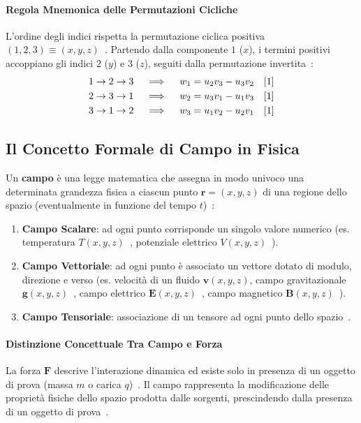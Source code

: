 \documentclass[12pt, a4paper]{article}
\begin{document}
\paragraph{Regola Mnemonica delle Permutazioni Cicliche}
L'ordine degli indici rispetta la permutazione ciclica positiva $(1, 2, 3) \equiv (x, y, z)$~\cite{1}. Partendo dalla componente $1$ ($x$), i termini positivi accoppiano gli indici $2$ ($y$) e $3$ ($z$), seguiti dalla permutazione invertita~\cite{1}:
\begin{align*}
1 \to 2 \to 3 &\quad \implies \quad w_1 = u_2 v_3 - u_3 v_2 \quad \text{\cite{1}} \\
2 \to 3 \to 1 &\quad \implies \quad w_2 = u_3 v_1 - u_1 v_3 \quad \text{\cite{1}} \\
3 \to 1 \to 2 &\quad \implies \quad w_3 = u_1 v_2 - u_2 v_1 \quad \text{\cite{1}}
\end{align*}

\subsection{Il Concetto Formale di Campo in Fisica}

Un \textbf{campo} è una legge matematica che assegna in modo univoco una determinata grandezza fisica a ciascun punto $\mathbf{r} = (x,y,z)$ di una regione dello spazio (eventualmente in funzione del tempo $t$)~\cite{1}:

\begin{enumerate}
    \item \textbf{Campo Scalare}: ad ogni punto corrisponde un singolo valore numerico (es. temperatura $T(x,y,z)$~\cite{1, 3}, potenziale elettrico $V(x,y,z)$~\cite{2}).
    \item \textbf{Campo Vettoriale}: ad ogni punto è associato un vettore dotato di modulo, direzione e verso (es. velocità di un fluido $\mathbf{v}(x,y,z)$, campo gravitazionale $\mathbf{g}(x,y,z)$~\cite{1}, campo elettrico $\mathbf{E}(x,y,z)$~\cite{2}, campo magnetico $\mathbf{B}(x,y,z)$~\cite{1, 3}).
    \item \textbf{Campo Tensoriale}: associazione di un tensore ad ogni punto dello spazio~\cite{1}.
\end{enumerate}

\paragraph{Distinzione Concettuale Tra Campo e Forza}
La forza $\mathbf{F}$ descrive l'interazione dinamica ed esiste solo in presenza di un oggetto di prova (massa $m$ o carica $q$)~\cite{1}. Il campo rappresenta la modificazione delle proprietà fisiche dello spazio prodotta dalle sorgenti, prescindendo dalla presenza di un oggetto di prova~\cite{1, 2}.
\end{document}
